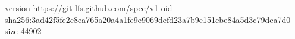 version https://git-lfs.github.com/spec/v1
oid sha256:3ad42f5fe2c8ea765a20a4a1fe9e9069defd23a7b9e151cbe84a5d3c79dca7d0
size 44902
